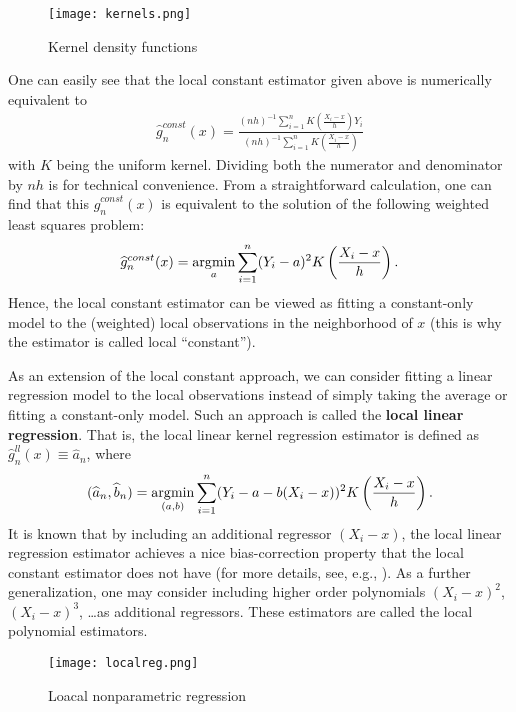 \documentclass[11pt, A4paper, openany, uplatex]{book}
\begin{document}
\begin{figure}[h!]
	\begin{center}
		\texttt{[image: kernels.png]}
		\caption{Kernel density functions}\label{fig:kernels}
	\end{center}
\end{figure}

One can easily see that the local constant estimator given above is numerically equivalent to
\begin{align*}
	\hat g^{const}_n(x) = \frac{(nh)^{-1}\sum_{i = 1}^n K\left( \frac{X_i - x}{h}\right) Y_i}{(nh)^{-1}\sum_{i = 1}^n K\left( \frac{X_i - x}{h}\right)}
\end{align*}
with $K$ being the uniform kernel.
Dividing both the numerator and denominator by $nh$ is for technical convenience.
From a straightforward calculation, one can find that this $\hat g^{const}_n(x)$ is equivalent to the solution of the following weighted least squares problem:
\begin{align*}
	\widehat g^{const}_n(x) = \operatorname*{\arg\!\min}_a \sum_{i = 1}^n (Y_i - a)^2K\left( \frac{X_i - x}{h}\right).
\end{align*}
Hence, the local constant estimator can be viewed as fitting a constant-only model to the (weighted) local observations in the neighborhood of $x$ (this is why the estimator is called local ``constant'').

As an extension of the local constant approach, we can consider fitting a linear regression model to the local observations instead of simply taking the average or fitting a constant-only model.
Such an approach is called the \textbf{local linear regression}.
That is, the local linear kernel regression estimator is defined as $\hat g^{ll}_n(x) \equiv \hat a_n$, where
\begin{align*}
	(\widehat a_n, \widehat b_n) = \operatorname*{\arg\!\min}_{(a, b)} \sum_{i = 1}^n (Y_i - a - b (X_i -x))^2K\left( \frac{X_i - x}{h}\right).
\end{align*}
It is known that by including an additional regressor $(X_i - x)$, the local linear regression estimator achieves a nice bias-correction property that the local constant estimator does not have (for more details, see, e.g., \cite{li2007nonparametric}).
As a further generalization, one may consider including higher order polynomials $(X_i - x)^2$, $(X_i - x)^3$, \ldots as additional regressors.
These estimators are called the local polynomial estimators.

\begin{figure}[h!]
	\begin{center}
		\texttt{[image: localreg.png]}
		\caption{Loacal nonparametric regression}
	\end{center}
\end{figure}
\end{document}
